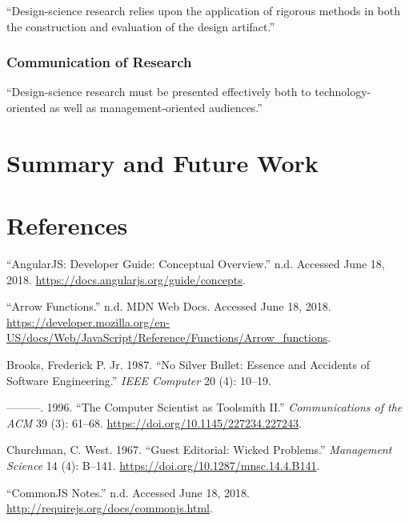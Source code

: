 \documentclass[a4paper,,tablecaptionabove]{scrbook}
\begin{document}
\enquote{Design-science research relies upon the application of rigorous
methods in both the construction and evaluation of the design artifact.}

\hypertarget{communication-of-research}{%
\subsection{Communication of Research}\label{communication-of-research}}

\enquote{Design-science research must be presented effectively both to
technology-oriented as well as management-oriented audiences.}

\hypertarget{summary-and-future-work}{%
\chapter{Summary and Future Work}\label{summary-and-future-work}}

\hypertarget{references}{%
\chapter*{References}\label{references}}

\hypertarget{refs}{}
\leavevmode\hypertarget{ref-AngularJSDeveloperGuide}{}%
``AngularJS: Developer Guide: Conceptual Overview.'' n.d. Accessed June
18, 2018. \url{https://docs.angularjs.org/guide/concepts}.

\leavevmode\hypertarget{ref-Arrowfunctions}{}%
``Arrow Functions.'' n.d. MDN Web Docs. Accessed June 18, 2018.
\url{https://developer.mozilla.org/en-US/docs/Web/JavaScript/Reference/Functions/Arrow_functions}.

\leavevmode\hypertarget{ref-BrooksNoSilverBullet1987}{}%
Brooks, Frederick P. Jr. 1987. ``No Silver Bullet: Essence and Accidents
of Software Engineering.'' \emph{IEEE Computer} 20 (4): 10--19.

\leavevmode\hypertarget{ref-BrooksComputerScientistToolsmith1996}{}%
---------. 1996. ``The Computer Scientist as Toolsmith II.''
\emph{Communications of the ACM} 39 (3): 61--68.
\url{https://doi.org/10.1145/227234.227243}.

\leavevmode\hypertarget{ref-ChurchmanGuesteditorialWicked1967a}{}%
Churchman, C. West. 1967. ``Guest Editorial: Wicked Problems.''
\emph{Management Science} 14 (4): B--141.
\url{https://doi.org/10.1287/mnsc.14.4.B141}.

\leavevmode\hypertarget{ref-CommonJSNotes}{}%
``CommonJS Notes.'' n.d. Accessed June 18, 2018.
\url{http://requirejs.org/docs/commonjs.html}.
\end{document}
